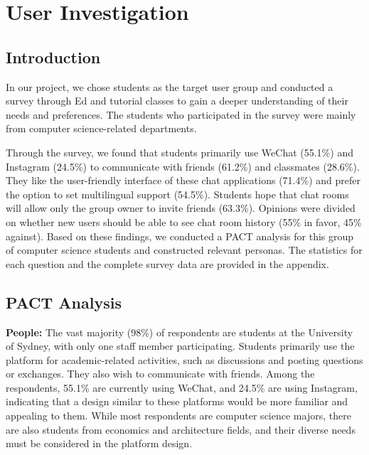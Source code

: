 \documentclass[12pt]{article}
\begin{document}
\section*{User Investigation}

    \subsection*{Introduction}
    \hspace{2em}In our project, we chose students as the target user group and conducted a survey through Ed and tutorial classes to gain a deeper understanding of their needs and preferences. The students who participated in the survey were mainly from computer science-related departments.

    Through the survey, we found that students primarily use WeChat (55.1\%) and Instagram (24.5\%) to communicate with friends (61.2\%) and classmates (28.6\%). They like the user-friendly interface of these chat applications (71.4\%) and prefer the option to set multilingual support (54.5\%). Students hope that chat rooms will allow only the group owner to invite friends (63.3\%). Opinions were divided on whether new users should be able to see chat room history (55\% in favor, 45\% against). Based on these findings, we conducted a PACT analysis for this group of computer science students and constructed relevant personas. The statistics for each question and the complete survey data are provided in the appendix.

    \subsection*{PACT Analysis}
    \hspace{2em}\textbf{People:} The vast majority (98\%) of respondents are students at the University of Sydney, with only one staff member participating. Students primarily use the platform for academic-related activities, such as discussions and posting questions or exchanges. They also wish to communicate with friends. Among the respondents, 55.1\% are currently using WeChat, and 24.5\% are using Instagram, indicating that a design similar to these platforms would be more familiar and appealing to them. While most respondents are computer science majors, there are also students from economics and architecture fields, and their diverse needs must be considered in the platform design.
\end{document}
